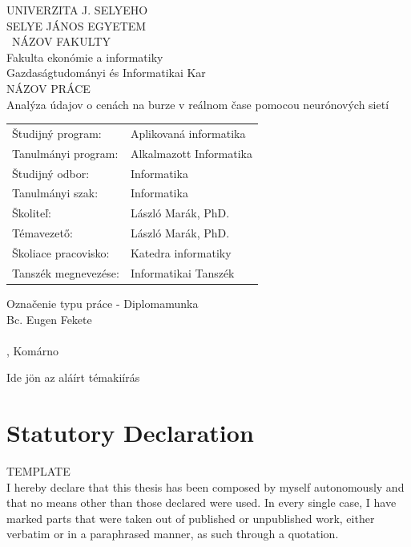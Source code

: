 \documentclass[a4paper,oneside,onecolumn,12pt]{LegrandOrangeBook}
\begin{document}
\cleardoublepage
\begingroup
\makeatletter
\let\ps@plain\ps@empty
\begin{minipage}[c][\textheight][c]{\textwidth}
	{\centering
	{\large UNIVERZITA J. SELYEHO\\SELYE JÁNOS EGYETEM}\\
	\vskip0.5cm
	{\ NÁZOV FAKULTY\\Fakulta ekonómie a informatiky\\Gazdaságtudományi és Informatikai Kar}\\
	\vfill
	{\Large NÁZOV PRÁCE\\Analýza údajov o cenách na burze v reálnom čase pomocou neurónových sietí }\\
	\vfill
	\thispagestyle{empty}
	\begin{tabular}{ll}
		Študijný program:    & Aplikovaná informatika \\
		Tanulmányi program:  & Alkalmazott Informatika\\
		Študijný odbor:      & Informatika\\
		Tanulmányi szak:     & Informatika\\
		Školiteľ:            & László Marák, PhD.\\
		Témavezető:          & László Marák, PhD.\\
		Školiace pracovisko: & Katedra informatiky\\
		Tanszék megnevezése: & Informatikai Tanszék\\
	\end{tabular}
	\vfill
	Označenie typu práce - Diplomamunka\\
	Bc. Eugen Fekete\\
    \ISBN \\
	\hfill\the\year{}, Komárno\hfill
	}
\end{minipage}
\endgroup
{
\hspace*{-2cm}
\pagebreak

Ide jön az aláírt témakiírás
\pagebreak
}

\chapter*{Statutory Declaration}
TEMPLATE\\
I hereby declare that this thesis has been composed by myself autonomously and that no means other than those declared
were used. In every single case, I have marked parts that were taken out of published or unpublished work, either verbatim or in a paraphrased manner, as such through a quotation.
\pagebreak
\end{document}
